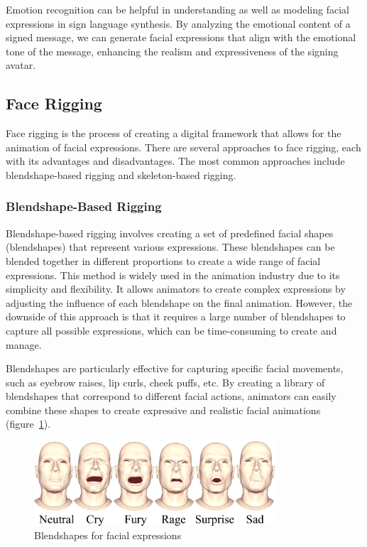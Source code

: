 \documentclass[../../main]{subfiles}
\begin{document}
Emotion recognition can be helpful in understanding as well as modeling facial expressions in sign language synthesis. By analyzing the emotional content of a signed message, we can generate facial expressions that align with the emotional tone of the message, enhancing the realism and expressiveness of the signing avatar.

\subsection{Face Rigging}
\label{ch:facial_expressions:related_work:face_rigging}

Face rigging is the process of creating a digital framework that allows for the animation of facial expressions. There are several approaches to face rigging, each with its advantages and disadvantages. The most common approaches include blendshape-based rigging and skeleton-based rigging.

\subsubsection{Blendshape-Based Rigging}
\label{ch:facial_expressions:related_work:face_rigging:blendshape_based_rigging}

Blendshape-based rigging involves creating a set of predefined facial shapes (blendshapes) that represent various expressions. These blendshapes can be blended together in different proportions to create a wide range of facial expressions. This method is widely used in the animation industry due to its simplicity and flexibility. It allows animators to create complex expressions by adjusting the influence of each blendshape on the final animation. However, the downside of this approach is that it requires a large number of blendshapes to capture all possible expressions, which can be time-consuming to create and manage.

Blendshapes are particularly effective for capturing specific facial movements, such as eyebrow raises, lip curls, cheek puffs, etc. By creating a library of blendshapes that correspond to different facial actions, animators can easily combine these shapes to create expressive and realistic facial animations (figure~\ref{ch:facial_expressions:fig:blendshapes}).

\begin{figure}
    \centering
    \includegraphics[width=0.8\textwidth]{chapters/facial_expressions/images/blendshapes.png}
    \caption{Blendshapes for facial expressions}
    \label{ch:facial_expressions:fig:blendshapes}
\end{figure}
\end{document}
